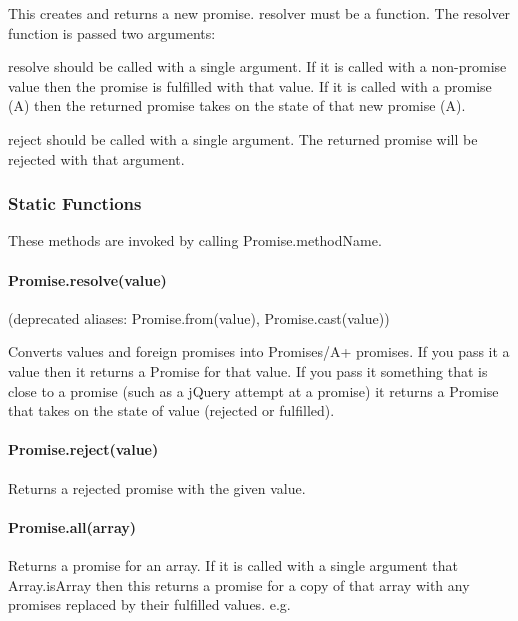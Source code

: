 This creates and returns a new promise. {\ttfamily resolver} must be a function. The {\ttfamily resolver} function is passed two arguments\+:


\begin{DoxyEnumerate}
\item {\ttfamily resolve} should be called with a single argument. If it is called with a non-\/promise value then the promise is fulfilled with that value. If it is called with a promise (A) then the returned promise takes on the state of that new promise (A).
\item {\ttfamily reject} should be called with a single argument. The returned promise will be rejected with that argument.
\end{DoxyEnumerate}

\subsubsection*{Static Functions}

These methods are invoked by calling {\ttfamily Promise.\+method\+Name}.

\paragraph*{Promise.\+resolve(value)}

(deprecated aliases\+: {\ttfamily Promise.\+from(value)}, {\ttfamily Promise.\+cast(value)})

Converts values and foreign promises into Promises/\+A+ promises. If you pass it a value then it returns a Promise for that value. If you pass it something that is close to a promise (such as a j\+Query attempt at a promise) it returns a Promise that takes on the state of {\ttfamily value} (rejected or fulfilled).

\paragraph*{Promise.\+reject(value)}

Returns a rejected promise with the given value.

\paragraph*{Promise.\+all(array)}

Returns a promise for an array. If it is called with a single argument that {\ttfamily Array.\+is\+Array} then this returns a promise for a copy of that array with any promises replaced by their fulfilled values. e.\+g.


